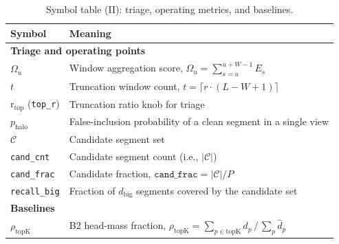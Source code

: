 \begin{table}[!thbp]
\centering
\small
\begin{tabular}{lp{}}
\toprule
Symbol & Meaning \\
\midrule
\multicolumn{2}{l}{\textbf{Triage and operating points}} \\
$\Omega_u$ & Window aggregation score, $\Omega_u=\sum_{s=u}^{u+W-1}E_s$ \\
$t$ & Truncation window count, $t=\lceil r\cdot(L{-}W{+}1)\rceil$ \\
$\mathrm{r_{top}}$ (\texttt{top\_r}) & Truncation ratio knob for triage \\
$p_{\mathrm{halo}}$ & False-inclusion probability of a clean segment in a single view \\
$\mathcal{C}$ & Candidate segment set \\
\texttt{cand\_cnt} & Candidate segment count (i.e., $|\mathcal{C}|$) \\
\texttt{cand\_frac} & Candidate fraction, $\texttt{cand\_frac}=|\mathcal{C}|/P$ \\
\texttt{recall\_big} & Fraction of $d_{\text{big}}$ segments covered by the candidate set \\
\midrule
\multicolumn{2}{l}{\textbf{Baselines}} \\
$\rho_{\text{topK}}$ & B2 head-mass fraction, $\rho_{\text{topK}}=\sum_{p\in\text{topK}}\hat{d}_p\,/\,\sum_p\hat{d}_p$ \\
\bottomrule
\end{tabular}
\caption{Symbol table (II): triage, operating metrics, and baselines.}
\label{tab:notations-3}
\end{table}


